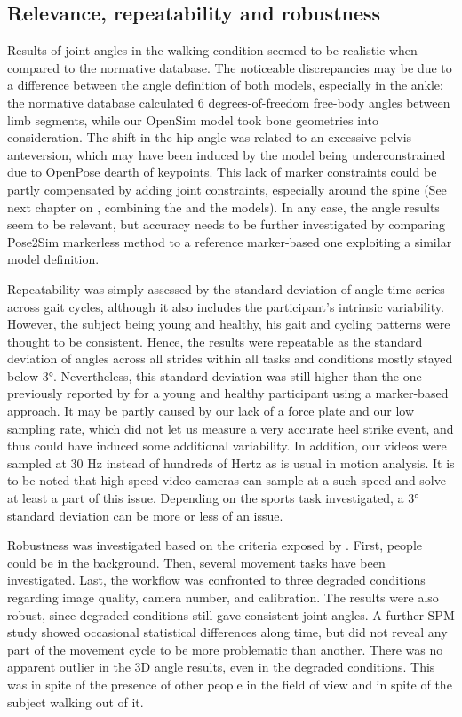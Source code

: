 \subsection{Relevance, repeatability and robustness}

Results of joint angles in the walking condition seemed to be realistic when compared to the normative database. The noticeable discrepancies may be due to a difference between the angle definition of both models, especially in the ankle: the normative database calculated 6 degrees-of-freedom free-body angles between limb segments, while our OpenSim model took bone geometries into consideration. The shift in the hip angle was related to an excessive pelvis anteversion, which may have been induced by the model being underconstrained due to OpenPose dearth of keypoints. This lack of marker constraints could be partly compensated by adding joint constraints, especially around the spine (See next chapter on , combining the \cite{Rajagopal2016} and the \cite{Beaucage-Gauvreau2019} models). In any case, the angle results seem to be relevant, but accuracy needs to be further investigated by comparing Pose2Sim markerless method to a reference marker-based one exploiting a similar model definition.

\newpage
Repeatability was simply assessed by the standard deviation of angle time series across gait cycles, although it also includes the participant’s intrinsic variability. However, the subject being young and healthy, his gait and cycling patterns were thought to be consistent. Hence, the results were repeatable as the standard deviation of angles across all strides within all tasks and conditions mostly stayed below 3°. Nevertheless, this standard deviation was still higher than the one previously reported by \cite{Kang2008} for a young and healthy participant using a marker-based approach. It may be partly caused by our lack of a force plate and our low sampling rate, which did not let us measure a very accurate heel strike event, and thus could have induced some additional variability. In addition, our videos were sampled at 30 Hz instead of hundreds of Hertz as is usual in motion analysis. It is to be noted that high-speed video cameras can sample at a such speed and solve at least a part of this issue. Depending on the sports task investigated, a 3° standard deviation can be more or less of an issue.

Robustness was investigated based on the criteria exposed by \cite{Moeslund2001}. First, people could be in the background. Then, several movement tasks have been investigated. Last, the workflow was confronted to three degraded conditions regarding image quality, camera number, and calibration. The results were also robust, since degraded conditions still gave consistent joint angles. A further SPM study showed occasional statistical differences along time, but did not reveal any part of the movement cycle to be more problematic than another. There was no apparent outlier in the 3D angle results, even in the degraded conditions. This was in spite of the presence of other people in the field of view and in spite of the subject walking out of it.

